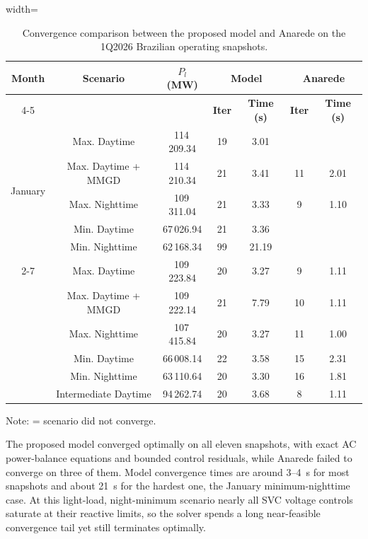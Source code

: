 \documentclass[letterpaper,journal]{IEEEtran}
\newcommand{\xmark}{\ding{55}}
\begin{document}
\begin{table}[!htbp]
	\centering
	\scriptsize
	\caption{Convergence comparison between the proposed model and Anarede on the 1Q2026 Brazilian operating snapshots.}
	\label{tab:model_anarede}
	\renewcommand{\arraystretch}{1.2}
	\setlength{\tabcolsep}{4pt}
	\begin{adjustbox}{width=\columnwidth}
	\begin{tabular}{ccccccc}
		\hline
		\textbf{Month} & \textbf{Scenario} & \textbf{$P_l$ (MW)} & \multicolumn{2}{c}{\textbf{Model}} & \multicolumn{2}{c}{\textbf{Anarede}} \\
		\cline{4-5}\cline{6-7}
		& & & \textbf{Iter} & \textbf{Time (s)} & \textbf{Iter} & \textbf{Time (s)}\\ \hline
		\multirow{5}{*}{January} & Max. Daytime & 114\,209.34 & 19 & 3.01 & \xmark & \xmark \\
		& Max. Daytime + MMGD & 114\,210.34 & 21 & 3.41 & 11 & 2.01 \\
		& Max. Nighttime & 109\,311.04 & 21 & 3.33 & 9 & 1.10 \\
		& Min. Daytime & 67\,026.94 & 21 & 3.36 & \xmark & \xmark \\
		& Min. Nighttime & 62\,168.34 & 99 & 21.19 & \xmark & \xmark \\ \cline{2-7}
		\multirow{6}{*}{April} & Max. Daytime & 109\,223.84 & 20 & 3.27 & 9 & 1.11 \\
		& Max. Daytime + MMGD & 109\,222.14 & 21 & 7.79 & 10 & 1.11 \\
		& Max. Nighttime & 107\,415.84 & 20 & 3.27 & 11 & 1.00 \\
		& Min. Daytime & 66\,008.14 & 22 & 3.58 & 15 & 2.31 \\
		& Min. Nighttime & 63\,110.64 & 20 & 3.30 & 16 & 1.81 \\
		& Intermediate Daytime & 94\,262.74 & 20 & 3.68 & 8 & 1.11 \\ \hline
	\end{tabular}
	\end{adjustbox}

	{\footnotesize Note: \xmark = scenario did not converge.}
\end{table}

The proposed model converged optimally on all eleven snapshots, with exact AC power-balance
equations and bounded control residuals, while Anarede failed to converge on three of them. Model convergence times are around
3--4~s for most snapshots and about 21~s for the hardest one, the January minimum-nighttime case. At this
light-load, night-minimum scenario nearly all SVC voltage controls saturate at their reactive limits, so the solver spends
a long near-feasible convergence tail yet still terminates optimally.
\end{document}
